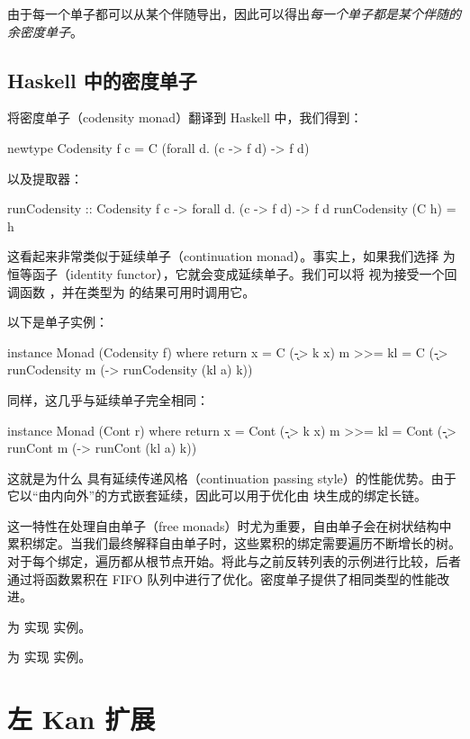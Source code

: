 \documentclass[DaoFP]{subfiles}
\begin{document}
由于每一个单子都可以从某个伴随导出，因此可以得出\emph{每一个单子都是某个伴随的余密度单子}。

\subsection{Haskell 中的密度单子}

将密度单子（codensity monad）翻译到 Haskell 中，我们得到：
\begin{haskell}
newtype Codensity f c = C (forall d. (c -> f d) -> f d)
\end{haskell}
以及提取器：
\begin{haskell}
runCodensity :: Codensity f c -> forall d. (c -> f d) -> f d
runCodensity (C h) = h
\end{haskell}
这看起来非常类似于延续单子（continuation monad）。事实上，如果我们选择  为恒等函子（identity functor），它就会变成延续单子。我们可以将  视为接受一个回调函数 ，并在类型为  的结果可用时调用它。

以下是单子实例：
\begin{haskell}
instance Monad (Codensity f) where
  return x = C (\k -> k x)
  m >>= kl = C (\k -> runCodensity m (\a -> runCodensity (kl a) k))
\end{haskell}
同样，这几乎与延续单子完全相同：
\begin{haskell}
instance Monad (Cont r) where
  return x = Cont (\k -> k x)
  m >>= kl = Cont (\k -> runCont m (\a -> runCont (kl a) k))
\end{haskell}
这就是为什么  具有延续传递风格（continuation passing style）的性能优势。由于它以“由内向外”的方式嵌套延续，因此可以用于优化由  块生成的绑定长链。

这一特性在处理自由单子（free monads）时尤为重要，自由单子会在树状结构中累积绑定。当我们最终解释自由单子时，这些累积的绑定需要遍历不断增长的树。对于每个绑定，遍历都从根节点开始。将此与之前反转列表的示例进行比较，后者通过将函数累积在 FIFO 队列中进行了优化。密度单子提供了相同类型的性能改进。

\begin{exercise}
为  实现  实例。
\end{exercise}
\begin{exercise}
为  实现  实例。
\end{exercise}

\section{左 Kan 扩展}
\end{document}
